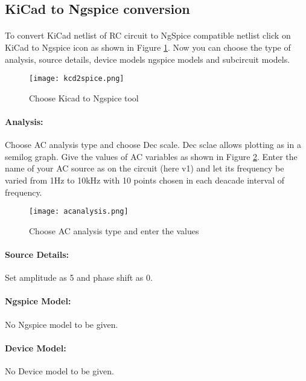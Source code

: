 \subsection{KiCad to Ngspice conversion}

\paragraph{} To convert KiCad netlist of RC circuit to NgSpice
compatible netlist click on KiCad to Ngspice icon as shown in Figure \ref{kcd2spiceRC}.  Now you can choose the type of analysis, source details, device models ngspice models and subcircuit models.


\begin{figure}[h]
\centering
\texttt{[image: kcd2spice.png]}
\caption{Choose Kicad to Ngspice tool}
\label{kcd2spiceRC}
\end{figure}


\paragraph{Analysis:}Choose AC analysis type and choose Dec scale. Dec sclae allows plotting as in a semilog graph.  Give the values of AC variables as shown in Figure \ref{acanalysis}. Enter the name of your AC source as on the circuit (here v1) and let its frequency be varied from 1Hz to 10kHz with 10 points chosen in each deacade interval of frequency.

\begin{figure}[h]
\centering
\texttt{[image: acanalysis.png]}
\caption{Choose AC analysis type and enter the values}
\label{acanalysis}
\end{figure}

\paragraph{Source Details:} Set amplitude as 5 and phase shift as 0.

\paragraph{Ngspice Model:} No Ngspice model to be given.

\paragraph{Device Model:} No Device model to be given.

